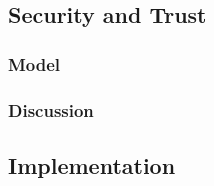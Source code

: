 \subsection{Security and Trust}


\subsubsection{Model}

\subsubsection{Discussion}

\subsection{Implementation}



